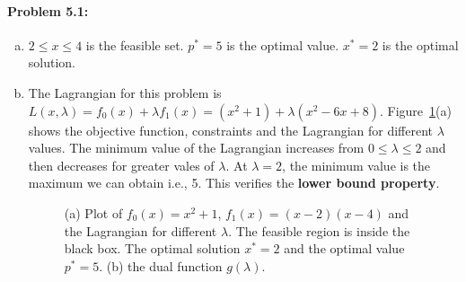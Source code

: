 \documentclass[12pt] {article}
\begin{document}
\paragraph{Problem 5.1:} 
\begin{enumerate}[(a)]
\item $2\leq x \leq 4$ is the feasible set. $p^{*}=5$ is the optimal value.  $x^{*}=2$ is the optimal solution. 
\item The Lagrangian for this problem is $L(x,\lambda)=f_{0}(x) + \lambda f_{1}(x) = (x^{2}+1) + 
\lambda \left(x^{2}-6x+8 \right)$. Figure~\ref{fig:5_1_b}(a) shows the objective function, constraints and the Lagrangian for different $\lambda$ values. The minimum value of the Lagrangian increases from $0 \leq \lambda \leq 2 $ and then decreases for greater vales of $\lambda$. At $\lambda =2$, the minimum value is the maximum we can obtain i.e., 5. This verifies the \textbf{lower bound property}.

\begin{figure}[!tbh]
\centering        
   \caption{(a) Plot of $f_{0}(x) = x^{2}+1$, $f_{1}(x) =(x-2)(x-4)$ and the Lagrangian for different $\lambda$. The feasible region is inside the black box. The optimal solution $x^{*}=2$ and the optimal value $p^{*}=5$. (b) the dual function $g(\lambda)$.}
   \label{fig:5_1_b}
\end{figure}


\end{enumerate}
\end{document}

